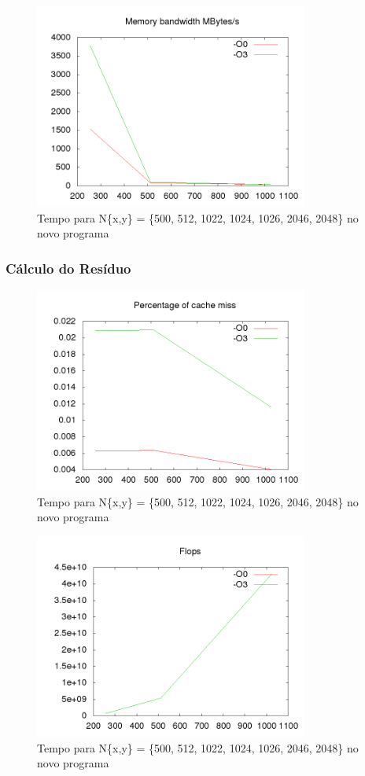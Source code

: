 \documentclass[12pt]{article}
\begin{document}
		\begin{figure}[ht!]
			\centering
			\includegraphics[width=90mm]{old_gs_mem.png}
			\caption{Tempo para N\{x,y\} = \{500, 512, 1022, 1024, 1026, 2046, 2048\} no novo programa
			\label{overflow}}
		\end{figure}
		\newpage		
		
		\subsubsection{Cálculo do Resíduo}
		\begin{figure}[ht!]
			\centering
			\includegraphics[width=90mm]{old_res_cache.png}
			\caption{Tempo para N\{x,y\} = \{500, 512, 1022, 1024, 1026, 2046, 2048\} no novo programa
			\label{overflow}}
		\end{figure}
		\newpage

		\begin{figure}[ht!]
			\centering
			\includegraphics[width=90mm]{old_res_flops.png}
			\caption{Tempo para N\{x,y\} = \{500, 512, 1022, 1024, 1026, 2046, 2048\} no novo programa
			\label{overflow}}
		\end{figure}
		\newpage
		
\end{document}
